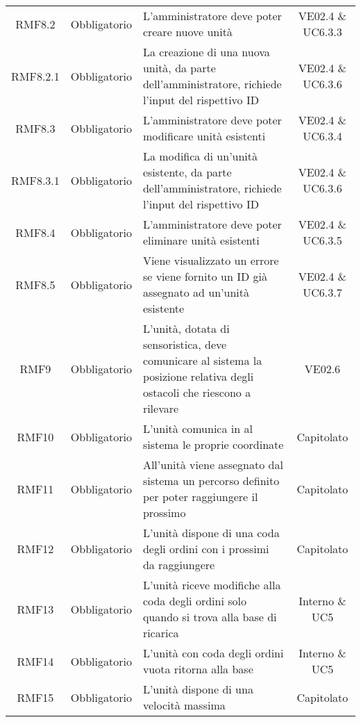 \begin{longtable}[h!] { c c m{8cm} c}
		RMF8.2 & Obbligatorio & L'amministratore deve poter creare nuove unità & VE02.4 \& UC6.3.3 \\
		
		RMF8.2.1 & Obbligatorio & La creazione di una nuova unità, da parte dell'amministratore, richiede l'input del rispettivo ID & VE02.4 \& UC6.3.6 \\
		
		RMF8.3 & Obbligatorio & L'amministratore deve poter modificare unità esistenti & VE02.4 \& UC6.3.4 \\
		
		RMF8.3.1 & Obbligatorio & La modifica di un'unità esistente, da parte dell'amministratore, richiede l'input  del rispettivo ID & VE02.4 \& UC6.3.6 \\
		
		RMF8.4 & Obbligatorio & L'amministratore deve poter eliminare unità esistenti & VE02.4 \& UC6.3.5 \\
		
		RMF8.5 & Obbligatorio & Viene visualizzato un errore se viene fornito un ID già assegnato ad un'unità esistente & VE02.4 \& UC6.3.7 \\
		
		RMF9 & Obbligatorio & L'unità, dotata di sensoristica, deve comunicare al sistema la posizione relativa degli ostacoli che riescono a rilevare & VE02.6 \\
		
		RMF10 & Obbligatorio & L'unità comunica in \glock{real-time} al sistema le proprie coordinate & Capitolato \\
		
		RMF11 & Obbligatorio & All'unità viene assegnato dal sistema un percorso definito per poter raggiungere il prossimo \glock{POI} & Capitolato \\
		
		RMF12 & Obbligatorio & L'unità dispone di una coda degli ordini con i prossimi \glock{POI} da raggiungere & Capitolato \\
		
		RMF13 & Obbligatorio & L'unità riceve modifiche alla coda degli ordini solo quando si trova alla base di ricarica & Interno \& UC5 \\
		
		RMF14 & Obbligatorio & L'unità con coda degli ordini vuota ritorna alla base & Interno \& UC5 \\
		
		RMF15 & Obbligatorio & L'unità dispone di una velocità massima & Capitolato \\
		

\end{longtable}
